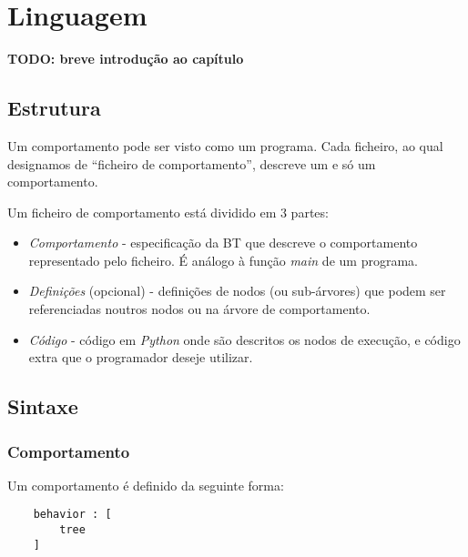 
\chapter{Linguagem} %
\label{Chapter3} 

\textbf{TODO: breve introdução ao capítulo}
\section{Estrutura}
Um comportamento pode ser visto como um programa. Cada ficheiro, ao qual designamos de ``ficheiro de comportamento'', descreve um e só um comportamento.

Um ficheiro de comportamento está dividido em 3 partes:
\begin{itemize}
    \item \textit{Comportamento} - especificação da BT que descreve o comportamento representado pelo ficheiro.
    É análogo à função \textit{main} de um programa.
    \item \textit{Definições} (opcional) - definições de nodos (ou sub-árvores) que podem ser referenciadas noutros nodos ou na árvore de comportamento.
    \item \textit{Código} - código em \textit{Python} onde são descritos os nodos de execução, e código extra que o programador deseje utilizar.
\end{itemize}


\section{Sintaxe}
\subsection{Comportamento}
Um comportamento é definido da seguinte forma:
\begin{lstlisting}
    behavior : [
        tree
    ]
\end{lstlisting}

